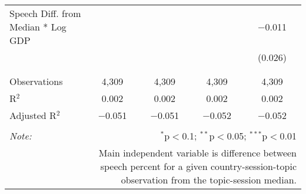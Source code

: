 \begin{table}[!htbp]
\begin{tabular}{@{\extracolsep{5pt}}lcccc}
 Speech Diff. from Median * Log GDP &  &  &  & $-$0.011 \\ 
  &  &  &  & (0.026) \\ 
  & & & & \\ 
\hline \\[-1.8ex] 
Observations & 4,309 & 4,309 & 4,309 & 4,309 \\ 
R$^{2}$ & 0.002 & 0.002 & 0.002 & 0.002 \\ 
Adjusted R$^{2}$ & $-$0.051 & $-$0.051 & $-$0.052 & $-$0.052 \\ 
\hline 
\hline \\[-1.8ex] 
\textit{Note:}  & \multicolumn{4}{r}{$^{*}$p$<$0.1; $^{**}$p$<$0.05; $^{***}$p$<$0.01} \\ 
 & \multicolumn{4}{r}{Main independent variable is difference between speech percent for a given country-session-topic observation from the topic-session median.} \\ 
\end{tabular} 
\end{table} 
